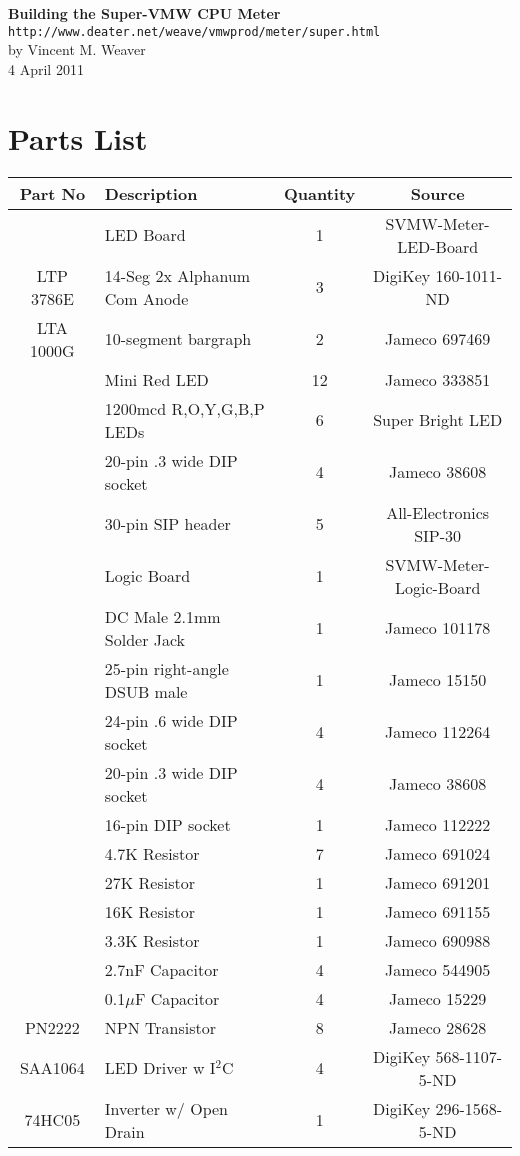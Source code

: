 \documentclass[11pt]{article}
\begin{document}
\begin{center}
{\Large \bf Building the Super-VMW CPU Meter}\\
{\tt http://www.deater.net/weave/vmwprod/meter/super.html}\\
by Vincent M. Weaver\\
4 April 2011
\end{center}


\section{Parts List}

\begin{tabular}{|c|l|c|c|}
\hline
Part No   &  Description    &  Quantity    &   Source \\
\hline
\hline

          &  LED Board                 & 1  & SVMW-Meter-LED-Board\\ %
LTP 3786E &  14-Seg 2x Alphanum Com Anode & 3 &  DigiKey 160-1011-ND \\ %
LTA 1000G &  10-segment bargraph       & 2  &  Jameco 697469 \\ %
          &  Mini Red LED              & 12 &  Jameco 333851 \\ %
	  &  1200mcd R,O,Y,G,B,P LEDs  & 6  &  Super Bright LED \\ %
	  &  20-pin .3 wide DIP socket & 4  &  Jameco 38608 \\ %
	  &  30-pin SIP header         & 5  &  All-Electronics SIP-30 \\ %
\hline
\hline
          & Logic Board                & 1  & SVMW-Meter-Logic-Board \\ %
	  & DC Male 2.1mm Solder Jack  & 1  &  Jameco 101178 \\ %
	  & 25-pin right-angle DSUB male & 1  &  Jameco 15150 \\ %
	  & 24-pin .6 wide DIP socket  & 4  &  Jameco 112264 \\ %
	  & 20-pin .3 wide DIP socket  & 4  &  Jameco 38608 \\ %
	  & 16-pin DIP socket          & 1  &  Jameco 112222 \\ %
	  & 4.7K Resistor              & 7  &  Jameco 691024 \\ %
	  & 27K Resistor               & 1  &  Jameco 691201 \\ %
	  & 16K Resistor               & 1  &  Jameco 691155 \\ %
	  & 3.3K Resistor              & 1  &  Jameco 690988 \\ %
	  & 2.7nF Capacitor            & 4  &  Jameco 544905 \\ %
	  & 0.1$\mu$F Capacitor        & 4  &  Jameco 15229 \\ %
PN2222    & NPN Transistor             & 8  &  Jameco 28628 \\ %
SAA1064   & LED Driver w I$^{2}$C      & 4  &  DigiKey 568-1107-5-ND \\ %
74HC05    & Inverter w/ Open Drain     & 1  &  DigiKey 296-1568-5-ND \\ %



\end{tabular}
\end{document}
